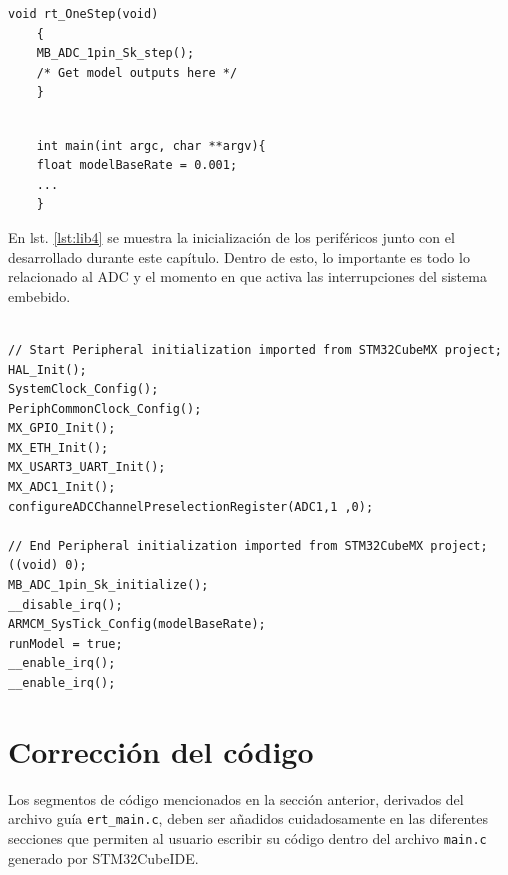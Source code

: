 \begin{minipage}{\textwidth}
	\begin{lstlisting}[caption={Sintentización de la función rt\_OneStep que brinda el EmbeddedCoder}, label={lst:lib2}]
	void rt_OneStep(void)
	{
	MB_ADC_1pin_Sk_step();
	/* Get model outputs here */
	}
	\end{lstlisting}
\end{minipage}	

\begin{minipage}{\textwidth}
	\begin{lstlisting}[caption={En el main, se creó la variable de modelBaseRate que nos recuerda el valor asignado en la configuración que hicimos en Simulink. }, label={lst:lib3}]
		
	int main(int argc, char **argv){
	float modelBaseRate = 0.001;
	...
	}
	\end{lstlisting}
\end{minipage}	

En lst. \ref{lst:lib4} se muestra la inicialización de los periféricos junto con el desarrollado durante este capítulo. Dentro de esto, lo importante es todo lo relacionado al ADC y el momento en que activa las interrupciones del sistema embebido. \\

\begin{minipage}{\textwidth}
	\begin{lstlisting}[caption={Inicialización de los periféricos. Equivalente a la configuración que nos dan por default en el main.c y añade las funciones de inicialización del ADC. }, label={lst:lib4}]

// Start Peripheral initialization imported from STM32CubeMX project;
HAL_Init();
SystemClock_Config();
PeriphCommonClock_Config();
MX_GPIO_Init();
MX_ETH_Init();
MX_USART3_UART_Init();
MX_ADC1_Init();
configureADCChannelPreselectionRegister(ADC1,1 ,0);

// End Peripheral initialization imported from STM32CubeMX project;
((void) 0);
MB_ADC_1pin_Sk_initialize();
__disable_irq();
ARMCM_SysTick_Config(modelBaseRate);
runModel = true;
__enable_irq();
__enable_irq();
	\end{lstlisting}
\end{minipage}	


\section{Corrección del código}
Los segmentos de código mencionados en la sección anterior, derivados del archivo guía \texttt{ert\_main.c}, deben ser añadidos cuidadosamente en las diferentes secciones que permiten al usuario escribir su código dentro del archivo \texttt{main.c} generado por STM32CubeIDE.

